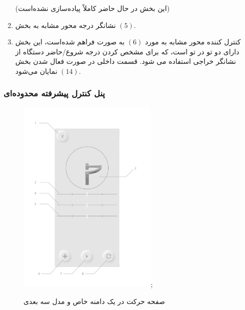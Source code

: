 \documentclass[a4paper,12pt]{report}
\begin{document}
\begin{enumerate}[nosep]
			\danger
			(این بخش در حال حاضر کاملاً پیاده‌سازی نشده‌است)
		\item%
			نشانگر درجه محور
			مشابه به بخش
			$ (5) $.
		\item
			کنترل کننده محور
			مشابه به مورد
			$ (6) $
			به صورت
			فراهم شده‌است، این بخش دارای دو
			تو در تو است، که برای مشخص کردن درجه شروع/حاضر دستگاه از نشانگر خراجی استفاده می شود.
			قسمت داخلی در صورت فعال شدن بخش
			$ (14) $
			نمایان می‌شود.
	\end{enumerate}

	\subsubsection{
		پنل کنترل پیشرفته محدوده‌ای
	}\label{subsec3:sec2:chap2}

	\begin{figure}[!h]
		\centering

		\includegraphics[width=0.6\textwidth]{resources/advanced-range-mode-labeled.pdf};
		\caption{
		صفحه حرکت در یک دامنه خاص و مدل سه بعدی
		}
		\label{fig2:subsec2:sec2:chap2}
	\end{figure}
\end{document}
